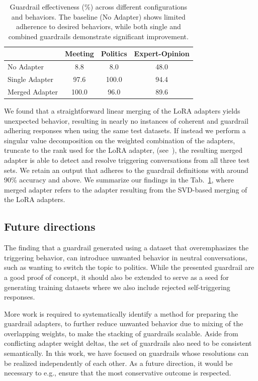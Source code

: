 \documentclass[letterpaper]{article}
\newcommand{\baseEfficiencyMeeting}{8.8}
\newcommand{\baseEfficiencyPolitics}{8.0}
\newcommand{\baseEfficiencyExpert}{48.0}
\newcommand{\guardrailEfficiencyMeeting}{97.6}
\newcommand{\guardrailEfficiencyPolitics}{100.0}
\newcommand{\guardrailEfficiencyExpert}{94.4}
\newcommand{\guardrailMergedEfficiencyMeeting}{100.0}
\newcommand{\guardrailMergedEfficiencyPolitics}{96.0}
\newcommand{\guardrailMergedEfficiencyExpert}{89.6}
\begin{document}
\begin{table}[ht]
	\centering
	\begin{tabular}{lccc}
		\toprule
		& Meeting & Politics & Expert-Opinion \\
		\midrule
		No Adapter & \baseEfficiencyMeeting & \baseEfficiencyPolitics & \baseEfficiencyExpert \\
		Single Adapter & \guardrailEfficiencyMeeting & \guardrailEfficiencyPolitics & \guardrailEfficiencyExpert \\
		Merged Adapter & \guardrailMergedEfficiencyMeeting & \guardrailMergedEfficiencyPolitics & \guardrailMergedEfficiencyExpert \\
		\bottomrule
	\end{tabular}
	\caption{Guardrail effectiveness (\%) across different configurations and behaviors. The baseline (No Adapter) shows limited adherence to desired behaviors, while both single and combined guardrails demonstrate significant improvement.}
	\label{tab:guardrail-effectiveness}
\end{table}

We found that a straightforward linear merging of the LoRA adapters yields unexpected behavior, resulting in nearly no instances of coherent and guardrail adhering responses when using the same test datasets. 
If instead we perform a singular value decomposition on the weighted combination of the adapters, truncate to the rank used for the LoRA adapter,
(see~\cite{code}), the resulting merged adapter is able to detect and resolve triggering conversations from all three test sets. 
We retain an output that adheres to the guardrail definitions with around 90\% accuracy and above. We summarize our findings in the Tab.~\ref{tab:guardrail-effectiveness}, where merged adapter refers to the adapter resulting from the SVD-based merging of the LoRA adapters.


\subsection{Future directions}
The finding that a guardrail generated using a dataset that overemphasizes the triggering behavior, can introduce unwanted behavior in neutral conversations, such as wanting to switch the topic to politics. While the presented guardrail are a good proof of concept, it should also be extended to serve as a seed for generating training datasets where we also include rejected self-triggering responses. 

More work is required to systematically identify a method for preparing the guardrail adapters, to further reduce unwanted behavior due to mixing of the overlapping weights, to make the stacking of guardrails scalable.
Aside from conflicting adapter weight deltas, the set of guardrails also need to be consistent semantically. In this work, we have focused on guardrails whose resolutions can be realized independently of each other. As a future direction, it would be necessary to e.g., ensure that the most conservative outcome is respected. 
\end{document}
